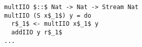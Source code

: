 \begin{minipage}{0.42\columnwidth}
\begin{lstlisting}[frame=tb]
multIIO $::$ Nat -> Nat -> Stream Nat
multIIO (S x$_1$) y = do
  r$_1$ <- multIIO x$_1$ y
  addIIO y r$_1$
...
\end{lstlisting}
\end{minipage}
